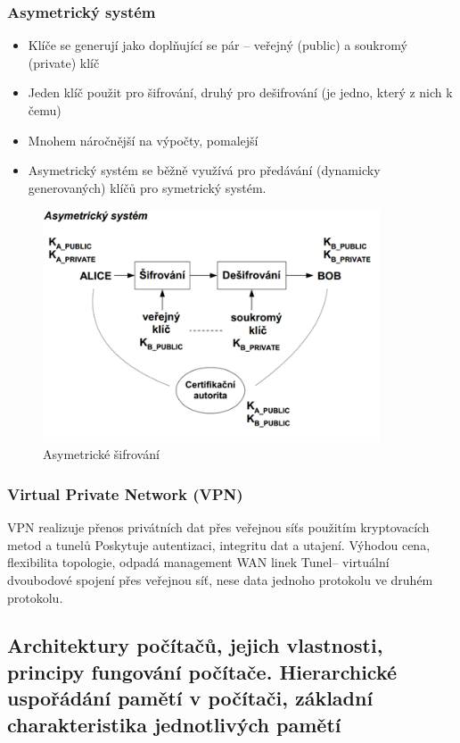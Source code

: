\documentclass[10pt,a4paper]{article}
\begin{document}
\subsubsection{Asymetrický systém}

\begin{itemize}
\item Klíče se generují jako doplňující se pár – veřejný (public) a soukromý (private) klíč
\item Jeden klíč použit pro šifrování, druhý pro dešifrování (je jedno, který z nich k čemu)
\item Mnohem náročnější na výpočty, pomalejší
\item Asymetrický systém se běžně využívá pro předávání (dynamicky generovaných) klíčů pro symetrický systém.
\end{itemize}
\begin{figure}[ht]
    \centering
    \includegraphics[width=10cm]{asym-sifr.png}
    \caption{Asymetrické šifrování}
    \label{fig:asymSifr}
\end{figure}
\subsubsection{Virtual Private Network (VPN)}
VPN realizuje přenos privátních dat přes veřejnou síťs použitím kryptovacích metod a tunelů Poskytuje autentizaci, integritu dat a utajení. Výhodou cena, flexibilita topologie, odpadá management WAN linek Tunel– virtuální dvoubodové spojení přes veřejnou síť, nese data jednoho protokolu ve druhém protokolu.

\subsection{Architektury počítačů, jejich vlastnosti, principy fungování počítače. Hierarchické uspořádání pamětí v počítači, základní charakteristika jednotlivých pamětí}
\end{document}
